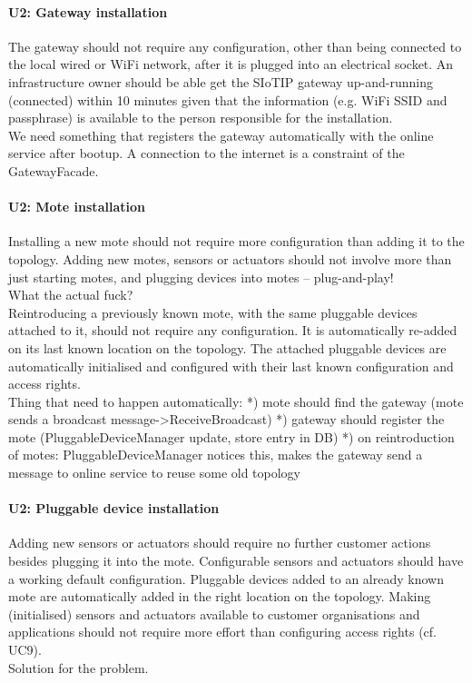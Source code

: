     \paragraph{U2: Gateway installation}
        The gateway should not require any configuration, other than being connected
        to the local wired or WiFi network, after it is plugged into an electrical
        socket. An infrastructure owner should be able get the SIoTIP gateway
        up-and-running (connected) within 10 minutes given that the information
        (e.g. WiFi SSID and passphrase) is available to the person responsible for
        the installation. \\
        We need something that registers the gateway automatically with the
        online service after bootup. A connection to the internet is a constraint
        of the GatewayFacade.

    \paragraph{U2: Mote installation}
        Installing a new mote should not require more configuration than adding it
        to the topology. Adding new motes, sensors or actuators should not involve
        more than just starting motes, and plugging devices into motes – plug-and-play! \\
        What the actual fuck? \\
        Reintroducing a previously known mote, with the same pluggable devices attached to it,
        should not require any configuration. It is automatically re-added on
        its last known location on the topology. The attached pluggable devices
        are automatically initialised and configured with their last known
        configuration and access rights. \\
        Thing that need to happen automatically:
        *) mote should find the gateway (mote sends a broadcast message->ReceiveBroadcast)
        *) gateway should register the mote (PluggableDeviceManager update, store entry in DB)
        *) on reintroduction of motes: PluggableDeviceManager notices this, makes the gateway send a message to online service to reuse some old topology

    \paragraph{U2: Pluggable device installation}
        Adding new sensors or actuators should require no further customer
        actions besides plugging it into the mote. Configurable sensors and
        actuators should have a working default configuration.
        Pluggable devices added to an already known mote are automatically
        added in the right location on the topology.
        Making (initialised) sensors and actuators available to customer
        organisations and applications should not require more effort than
        configuring access rights (cf. UC9). \\
        Solution for the problem.

